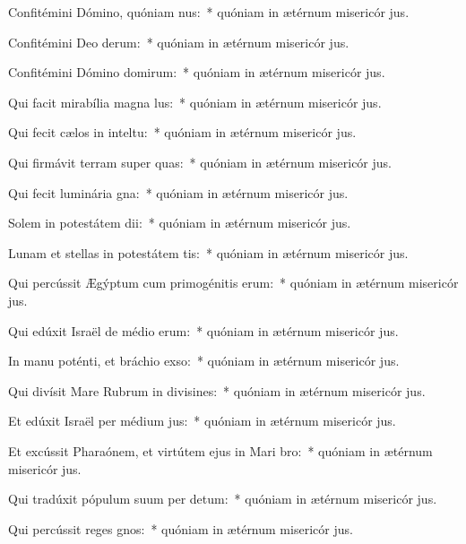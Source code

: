 \item Confitémini Dómino, quóniam nus:~* quóniam in ætérnum misericór jus.
\item Confitémini Deo derum:~* quóniam in ætérnum misericór jus.
\item Confitémini Dómino domirum:~* quóniam in ætérnum misericór jus.
\item Qui facit mirabília magna lus:~* quóniam in ætérnum misericór jus.
\item Qui fecit cælos in inteltu:~* quóniam in ætérnum misericór jus.
\item Qui firmávit terram super quas:~* quóniam in ætérnum misericór jus.
\item Qui fecit luminária gna:~* quóniam in ætérnum misericór jus.
\item Solem in potestátem dii:~* quóniam in ætérnum misericór jus.
\item Lunam et stellas in potestátem tis:~* quóniam in ætérnum misericór jus.
\item Qui percússit Ægýptum cum primogénitis erum:~* quóniam in ætérnum misericór jus.
\item Qui edúxit Israël de médio erum:~* quóniam in ætérnum misericór jus.
\item In manu poténti, et bráchio exso:~* quóniam in ætérnum misericór jus.
\item Qui divísit Mare Rubrum in divisines:~* quóniam in ætérnum misericór jus.
\item Et edúxit Israël per médium jus:~* quóniam in ætérnum misericór jus.
\item Et excússit Pharaónem, et virtútem ejus in Mari bro:~* quóniam in ætérnum misericór jus.
\item Qui tradúxit pópulum suum per detum:~* quóniam in ætérnum misericór jus.
\item Qui percússit reges gnos:~* quóniam in ætérnum misericór jus.

